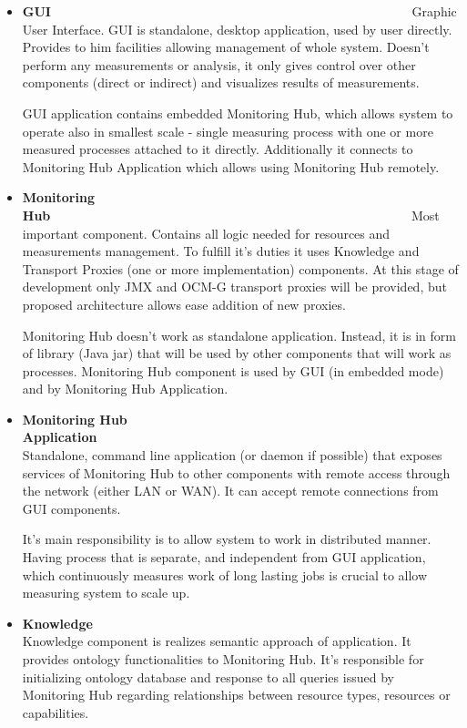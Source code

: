 \begin{itemize}
 \item {\bf GUI}~~~~~~~~~~~~~~~~~~~~~~~~~~~~~~~~~~~~~~~~~~~~~~~~~~~~~~~~\linebreak
Graphic User Interface. GUI is standalone, desktop application, used by user directly. Provides to him facilities
allowing management of whole system. Doesn't perform any measurements or analysis, it only gives control over other
components (direct or indirect) and visualizes results of measurements.

GUI application contains embedded Monitoring Hub, which allows system to operate also in smallest scale - single
measuring process with one or more measured processes attached to it directly. Additionally it connects to
Monitoring Hub Application which allows using Monitoring Hub remotely.

 \item {\bf Monitoring Hub}~~~~~~~~~~~~~~~~~~~~~~~~~~~~~~~~~~~~~~~~~~~~~~~~~~~~~~~~\linebreak
Most important component. Contains all logic needed for resources and measurements management. To fulfill it's
duties it uses Knowledge and Transport Proxies (one or more implementation) components. At this stage of development
only JMX and OCM-G transport proxies will be provided, but proposed architecture allows ease addition of new proxies. 

Monitoring Hub doesn't work as standalone application. Instead, it is in form of library (Java jar) that will be used by
other components that will work as processes. Monitoring Hub component is used by GUI (in embedded mode) and by
Monitoring Hub Application.

 \item {\bf Monitoring Hub Application}~~~~~~~~~~~~~~~~~~~~~~~~~~~~~~~~~~~~~~~~~~~~~~~~~~~~~~~~\linebreak
Standalone, command line application (or daemon if possible) that exposes services of Monitoring Hub to other
components with remote access through the network (either LAN or WAN). It can accept remote connections from GUI
components.

It's main responsibility is to allow system to work in distributed manner. Having process that is separate, and
independent from GUI application, which continuously measures work of long lasting jobs is crucial to allow measuring
system to scale up. 

 \item {\bf Knowledge}~~~~~~~~~~~~~~~~~~~~~~~~~~~~~~~~~~~~~~~~~~~~~~~~~~~~~~~~\linebreak
Knowledge component is realizes semantic approach of application. It provides ontology functionalities to
Monitoring Hub. It's responsible for initializing ontology database and response to all queries issued by Monitoring Hub
regarding relationships between resource types, resources or capabilities.


\end{itemize}
